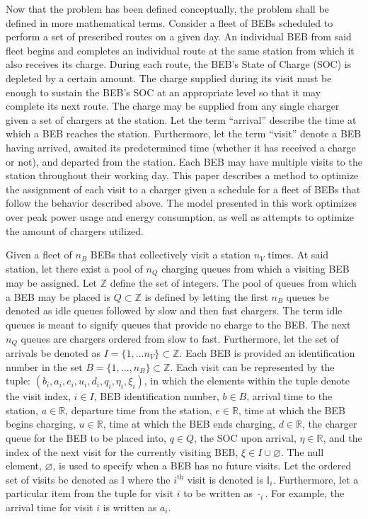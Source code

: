 \documentclass[ee,thesis]{usuthesis}
\newcommand{\visit}{(b_i, a_i, e_i, u_i, d_i, q_i, \eta_i, \xi_i)}
\newcommand{\I}{\mathbb{I}}                 %
\newcommand{\Iset}{I}                       %
\newcommand{\Qset}{Q}                       %
\begin{document}
Now that the problem has been defined conceptually, the problem shall be defined in more mathematical terms.
Consider a fleet of BEBs scheduled to perform a set of prescribed routes on a given day. An individual BEB from said
fleet begins and completes an individual route at the same station from which it also receives its charge. During each
route, the BEB's State of Charge (SOC) is depleted by a certain amount. The charge supplied during its visit must be
enough to sustain the BEB's SOC at an appropriate level so that it may complete its next route. The charge may be
supplied from any single charger given a set of chargers at the station. Let the term ``arrival'' describe the time at
which a BEB reaches the station. Furthermore, let the term ``visit'' denote a BEB having arrived, awaited its
predetermined time (whether it has received a charge or not), and departed from the station. Each BEB may have multiple
visits to the station throughout their working day. This paper describes a method to optimize the assignment of each
visit to a charger given a schedule for a fleet of BEBs that follow the behavior described above. The model presented in
this work optimizes over peak power usage and energy consumption, as well as attempts to optimize the amount of chargers
utilized.

Given a fleet of \(n_B\) BEBs that collectively visit a station \(n_V\) times. At said station, let there exist a pool of
\(n_Q\) charging queues from which a visiting BEB may be assigned. Let \(\mathbb{Z}\) define the set of integers. The pool of queues
from which a BEB may be placed is \(\Qset \subset \mathbb{Z}\) is defined by letting the first \(n_B\) queues be denoted as idle queues
followed by slow and then fast chargers. The term idle queues is meant to signify queues that provide no charge to the
BEB. The next \(n_Q\) queues are chargers ordered from slow to fast. Furthermore, let the set of arrivals be denoted as
\(\Iset = \{ 1, ... n_V \} \subset \mathbb{Z}\). Each BEB is provided an identification number in the set \(B = \{ 1, ..., n_B \} \subset \mathbb{Z}\).
Each visit can be represented by the tuple: \(\visit\), in which the elements within the tuple denote the visit index, \(i
\in I\), BEB identification number, \(b \in B\), arrival time to the station, \(a \in \mathbb{R}\), departure time from the station, \(e \in
\mathbb{R}\), time at which the BEB begins charging, \(u \in \mathbb{R}\), time at which the BEB ends charging, \(d \in \mathbb{R}\), the charger queue for
the BEB to be placed into, \(q \in Q\), the SOC upon arrival, \(\eta \in \mathbb{R}\), and the index of the next visit for the currently
visiting BEB, \(\xi \in I \cup \varnothing\). The null element, \(\varnothing\), is used to specify when a BEB has no future
visits. Let the ordered set of visits be denoted as \(\I\) where the \(i^{\text{th}}\) visit is denoted is \(\I_i\).
Furthermore, let a particular item from the tuple for visit \(i\) to be written as \(\cdot_i\). For example, the arrival time
for visit \(i\) is written as \(a_i\).
\end{document}
